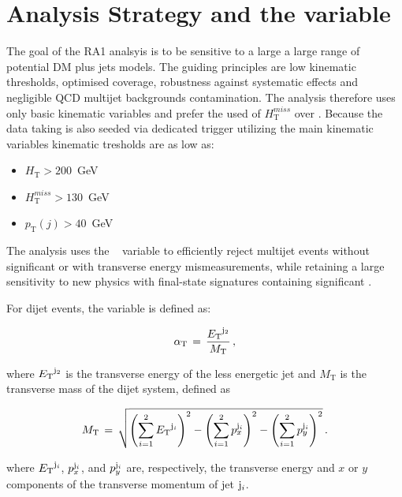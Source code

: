 \section{Analysis Strategy and the \alphat variable}

The goal of the RA1 analsyis is to be sensitive to a large a large range of potential DM plus jets models. The guiding principles are low kinematic thresholds, optimised coverage, robustness against systematic effects  and negligible QCD multijet backgrounds contamination. The analysis therefore uses only basic kinematic variables and prefer the used of $H^{miss}_\textrm{T}$ over \etmiss. Because the data taking is also seeded via dedicated trigger utilizing the main kinematic variables kinematic tresholds are as low as:

\begin{itemize}
   \item  $H_\textrm{T}>200$~GeV
   \item  $H^{miss}_\textrm{T}>130$~GeV
   \item  $p_\textrm{T}(j)>40$~GeV
\end{itemize}

The analysis uses the \alphat~\cite{Randall:2008rw, CMS:2008vya, CMS-PAS-SUS-09-001} variable to
 efficiently reject multijet events without significant \met or with transverse energy mismeasurements, 
while retaining a large sensitivity to new physics with final-state signatures containing significant \met.

For dijet events, the \alphat variable is defined as:

\begin{equation}
\label{eq:alphat}
\alpha_{\text{T}}\, =\, \frac{{E_{\text T}}^{{\rm j}_2}}{M_\text{T}} \, ,
\end{equation}

where ${E_{\text T}}^{\rm j_2}$ is the transverse energy of the less energetic
jet and $M_\text{T}$ is the transverse mass of the dijet system,
defined as

\begin{equation}
  \label{eq:mt}
  M_\text{T}\, = \,\sqrt{ \left( \sum_{i=1}^2 {E_{\text T}}^{{\rm j}_i}
    \right)^2 - \left( \sum_{i=1}^2 p_x^{{\rm j}_i} \right)^2 - \left(
      \sum_{i=1}^2 p_y^{{\rm j}_i} \right)^2} \, .
\end{equation}

where ${E_{\text T}}^{{\rm j}_i}$, $p_x^{{\rm j}_i}$, and $p_y^{{\rm j}_i}$ are,
respectively, the transverse energy and $x$ or $y$ components of the
transverse momentum of jet ${\rm j}_i$.

